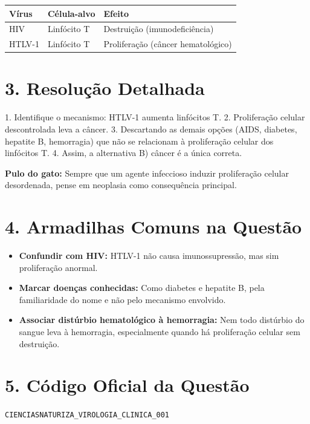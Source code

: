 \documentclass{article}
\begin{document}
\begin{center}
\begin{tabular}{|l|l|l|}
\hline
\textbf{Vírus} & \textbf{Célula-alvo} & \textbf{Efeito} \\
\hline
HIV  & Linfócito T      & Destruição (imunodeficiência) \\
HTLV-1 & Linfócito T      & Proliferação (câncer hematológico) \\
\hline
\end{tabular}
\end{center}

\section*{3. Resolução Detalhada}

1. Identifique o mecanismo: HTLV-1 aumenta linfócitos T.
2. Proliferação celular descontrolada leva a câncer.
3. Descartando as demais opções (AIDS, diabetes, hepatite B, hemorragia) que não se relacionam à proliferação celular dos linfócitos T.
4. Assim, a alternativa B) câncer é a única correta.

\textbf{Pulo do gato:} Sempre que um agente infeccioso induzir proliferação celular desordenada, pense em neoplasia como consequência principal.

\section*{4. Armadilhas Comuns na Questão}

\begin{itemize}
  \item \textbf{Confundir com HIV:} HTLV-1 não causa imunossupressão, mas sim proliferação anormal.
  \item \textbf{Marcar doenças conhecidas:} Como diabetes e hepatite B, pela familiaridade do nome e não pelo mecanismo envolvido.
  \item \textbf{Associar distúrbio hematológico à hemorragia:} Nem todo distúrbio do sangue leva à hemorragia, especialmente quando há proliferação celular sem destruição.
\end{itemize}

\section*{5. Código Oficial da Questão}

\texttt{CIENCIASNATURIZA\_VIROLOGIA\_CLINICA\_001}
\end{document}
